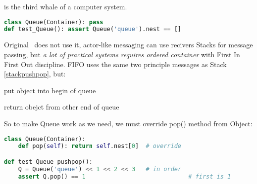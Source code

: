 \clearpage{}

 is the third whale of a computer system.

\begin{lstlisting}[language=Python]
class Queue(Container): pass
def test_Queue(): assert Queue('queue').nest == []
\end{lstlisting}

\noindent
Original \F\ does not use it, actor-like messaging can use recivers Stacks for
message passing, but
\emph{a lot of practical systems requires ordered container} with First In First Out
discipline. FIFO uses the same two principle messages as Stack
\ref{stackpushpop}, but:
\begin{description}[nosep]
\item[push] put object into begin of queue
\item[pop] return obejct from other end of queue
\end{description}

\clearpage
So to make Queue work as we need, we must override pop() method from Object:
\begin{lstlisting}[language=Python]
class Queue(Container):
	def pop(self): return self.nest[0]	# override

def test_Queue_pushpop():
	Q = Queue('queue') << 1 << 2 << 3	# in order
	assert Q.pop() == 1								# first is 1
\end{lstlisting}
    

